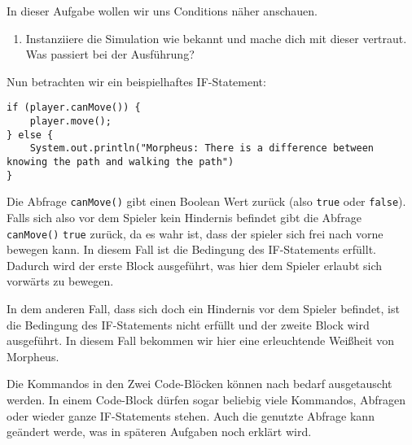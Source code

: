

In dieser Aufgabe wollen wir uns Conditions näher anschauen.

\begin{enumerate}                           
    \item Instanziiere die Simulation wie bekannt und mache dich mit dieser vertraut.
        Was passiert bei der Ausführung?
\end{enumerate}


\begin{Infobox}[IF-Condition]
    Nun betrachten wir ein beispielhaftes IF-Statement:

    \begin{lstlisting}[breaklines=true, numbers=none]
if (player.canMove()) {
    player.move();
} else {
    System.out.println("Morpheus: There is a difference between knowing the path and walking the path")
}
    \end{lstlisting}

    Die Abfrage \lstinline{canMove()} gibt einen Boolean Wert zurück (also \lstinline{true} oder \lstinline{false}).
    Falls sich also vor dem Spieler kein Hindernis befindet gibt die Abfrage \lstinline{canMove()} \lstinline{true} zurück, da es wahr ist, dass der spieler sich frei nach vorne bewegen kann.
    In diesem Fall ist die Bedingung des IF-Statements erfüllt. 
    Dadurch wird der erste Block ausgeführt, was hier dem Spieler erlaubt sich vorwärts zu bewegen. 

    In dem anderen Fall, dass sich doch ein Hindernis vor dem Spieler befindet, ist die Bedingung des IF-Statements nicht erfüllt und der zweite Block wird ausgeführt.
    In diesem Fall bekommen wir hier eine erleuchtende Weißheit von Morpheus.

    Die Kommandos in den Zwei Code-Blöcken können nach bedarf ausgetauscht werden.
    In einem Code-Block dürfen sogar beliebig viele Kommandos, Abfragen oder wieder ganze IF-Statements stehen.
    Auch die genutzte Abfrage kann geändert werde, was in späteren Aufgaben noch erklärt wird.
\end{Infobox}


